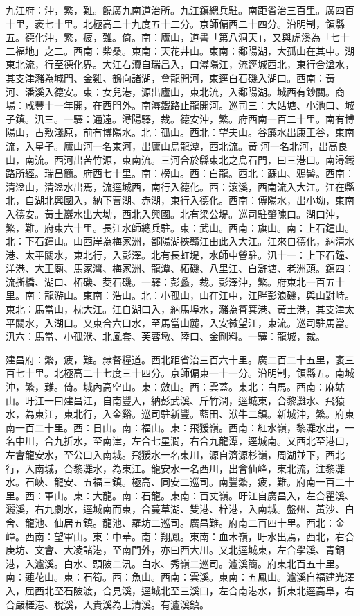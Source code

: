 \begin{pinyinscope}
九江府：沖，繁，難。饒廣九南道治所。九江鎮總兵駐。南距省治三百里。廣四百十里，袤七十里。北極高二十九度五十二分。京師偏西二十四分。沿明制，領縣五。德化沖，繁，疲，難。倚。南：廬山，道書「第八洞天」，又與虎溪為「七十二福地」之二。西南：柴桑。東南：天花井山。東南：鄱陽湖，大孤山在其中。湖東北流，行至德化界。大江右瀆自瑞昌入，曰潯陽江，流逕城西北，東行合湓水，其支津瀦為城門、金雞、鶴向諸湖，會龍開河，東逕白石磯入湖口。西南：黃河、潘溪入德安。東：女兒港，源出廬山，東北流，入鄱陽湖。城西有鈔關。商場：咸豐十一年開，在西門外。南潯鐵路止龍開河。巡司三：大姑塘、小池口、城子鎮。汛三。一驛：通遠。潯陽驛，裁。德安沖，繁。府西南一百二十里。南有博陽山，古敷淺原，前有博陽水。北：孤山。西北：望夫山。谷簾水出康王谷，東南流，入星子。廬山河一名東河，出廬山烏龍潭，西北流。黃河一名北河，出高良山，南流。西河出苦竹源，東南流。三河合於縣東北之烏石門，曰三港口。南潯鐵路所經。瑞昌簡。府西七十里。南：榜山。西：白龍。西北：蘇山、鴉髻。西南：清湓山，清湓水出焉，流逕城西，南行入德化。西：瀼溪，西南流入大江。江在縣北，自湖北興國入，納下曹湖、赤湖，東行入德化。西南：傅陽水，出小坳，東南入德安。黃土巖水出大坳，西北入興國。北有梁公堤。巡司駐肇陳口。湖口沖，繁，難。府東六十里。長江水師總兵駐。東：武山。西南：旗山。南：上石鐘山。北：下石鐘山。山西岸為梅家洲，鄱陽湖挾贛江由此入大江。江來自德化，納清水港、太平關水，東北行，入彭澤。北有長虹堤，水師中營駐。汛十一：上下石鐘、洋港、大王廟、馬家灣、梅家洲、龍潭、柘磯、八里江、白滸塘、老洲頭。鎮四：流撕橋、湖口、柘磯、茭石磯。一驛：彭蠡，裁。彭澤沖，繁。府東北一百五十里。南：龍游山。東南：浩山。北：小孤山，山在江中，江畔彭浪磯，與山對峙。東北：馬當山，枕大江。江自湖口入，納馬埠水，瀦為筲箕港、黃土港，其支津太平關水，入湖口。又東合六口水，至馬當山麓，入安徽望江，東流。巡司駐馬當。汛六：馬當、小孤洑、北風套、芙蓉墩、陸口、金剛料。一驛：龍城，裁。

建昌府：繁，疲，難。隸督糧道。西北距省治三百六十里。廣二百二十五里，袤三百七十里。北極高二十七度三十四分。京師偏東一十一分。沿明制，領縣五。南城沖，繁，難。倚。城內高空山。東：斂山。西：雲蓋。東北：白馬。西南：麻姑山。旴江一曰建昌江，自南豐入，納彭武溪、斤竹澗，逕城東，合黎灘水、飛猿水，為東江，東北行，入金谿。巡司駐新豐。藍田、洑牛二鎮。新城沖，繁。府東南一百二十里。西：日山。南：福山。東：飛猨嶺。西南：紅水嶺，黎灘水出，一名中川，合九折水，至南津，左合七星澗，右合九龍潭，逕城南。又西北至港口，左會龍安水，至公口入南城。飛猨水一名東川，源自濟源杉嶺，周湖並下，西北行，入南城，合黎灘水，為東江。龍安水一名西川，出會仙峰，東北流，注黎灘水。石峽、龍安、五福三鎮。極高、同安二巡司。南豐繁，疲，難。府南一百二十里。西：軍山。東：大龍。南：石龍。東南：百丈嶺。旴江自廣昌入，左合瞿溪、灑溪，右九劇水，逕城南而東，合蔓草湖、雙港、梓港，入南城。盤州、黃沙、白舍、龍池、仙居五鎮。龍池、羅坊二巡司。廣昌難。府南二百四十里。西北：金嶂。西南：望軍山。東：中華。南：翔鳳。東南：血木嶺，旴水出焉，西北，右合庚坊、文會、大凌諸港，至南門外，亦曰西大川。又北逕城東，左合學溪、青銅港，入瀘溪。白水、頭陂二汛。白水、秀嶺二巡司。瀘溪簡。府東北百五十里。南：蓮花山。東：石筍。西：魚山。西南：雲溪。東南：五鳳山。瀘溪自福建光澤入，屈西北至石陂渡，合見溪，逕城北至三溪口，左合南港水，折東北逕高阜，右合嚴槎港、稅溪，入貴溪為上清溪。有瀘溪鎮。


\end{pinyinscope}
